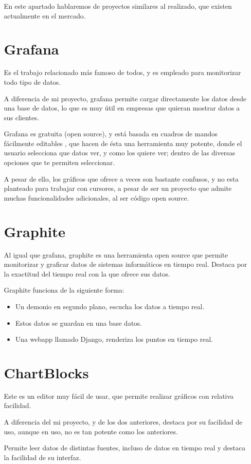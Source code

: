 
En este apartado hablaremos de proyectos similares al realizado,  que existen actualmente en el mercado.

\section{Grafana}
Es el trabajo relacionado más famoso de todos, y es empleado para monitorizar todo tipo de datos. 

A diferencia de mi proyecto, grafana permite cargar directamente los datos desde una base de datos, lo que es muy útil en empresas que quieran mostrar datos a sus clientes.

Grafana es gratuita (open source)\cite{GRAFANA}, y está basada en cuadros de mandos fácilmente editables , que hacen de ésta una herramienta muy potente, donde el usuario selecciona que datos ver, y como los quiere ver; dentro de las diversas opciones que te permiten seleccionar.

A pesar de ello, los gráficos que ofrece a veces son bastante confusos, y no esta planteado para trabajar con cursores, a pesar de ser un proyecto que admite muchas funcionalidades adicionales, al ser código open source.

\section{Graphite}
Al igual que grafana, graphite es una herramienta open source que permite monitorizar y graficar datos de sistemas informáticos en tiempo real.
Destaca por la exactitud del tiempo real con la que ofrece sus datos.

Graphite funciona de la siguiente forma\cite{GRAPHITE}:
\begin{itemize}
	\item Un demonio en segundo plano, escucha los datos a tiempo real.
	\item Estos datos se guardan en una base datos.
	\item Una webapp llamado Django, renderiza los puntos en tiempo real.
\end{itemize} 

\section{ChartBlocks}

Este es un editor muy fácil de usar, que permite realizar gráficos con relativa facilidad.

A diferencia del mi proyecto, y de los dos anteriores, destaca por su facilidad de uso, aunque en uso, no es tan potente como los anteriores.\cite{CHARTBLOCKS}

Permite leer datos de distintas fuentes, incluso de datos en tiempo real y destaca la facilidad de su interfaz.



